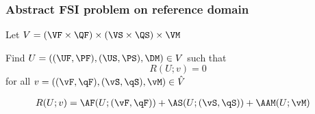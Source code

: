 \begin{frame}
  \frametitle{Abstract FSI problem on reference domain}

  Let $V = (\VF\times \QF)\times(\VS\times\QS)\times \VM$

  \vspace{0.5cm}

  Find $U = ((\UF, \PF), (\US, \PS), \DM) \in V$ such that
  \begin{equation*}
    R(U; v) = 0
  \end{equation*}
  for all $v = ((\vF, \qF), (\vS, \qS), \vM) \in
  \hat{V}$

  \begin{align*}
    R(U; v) &= \AF(U; (\vF, \qF)) +
               \AS(U; (\vS, \qS)) +
               \AAM(U; \vM)
  \end{align*}

\end{frame}
